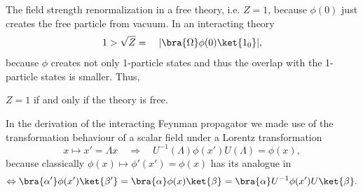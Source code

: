 The field strength renormalization in a free theory, i.e. $Z=1$, because $\phi(0)$ just creates the free particle from vacuum. In an interacting theory
\begin{equation}
	1 > \sqrt{Z} = \quad |\bra{\Omega} \phi(0) \ket{1_0}|,
\end{equation}
because $\phi$ creates not only 1-particle states and thus the overlap with the 1-particle states is smaller. Thus,
\begin{statements}
	$Z=1$ if and only if the theory is free.
\end{statements}
In the derivation of the interacting Feynman propagator we made use of the transformation behaviour of a scalar field under a Lorentz transformation
\begin{equation}
	x \mapsto x'=\Lambda x \quad \Rightarrow \quad U^{-1}(\Lambda)\phi(x') U(\Lambda) = \phi(x),
\end{equation}
because classically $\phi(x) \mapsto \phi'(x')=\phi(x)$ has its analogue in 
\begin{equation}
	\Leftrightarrow \bra{\alpha'} \phi(x') \ket{\beta'} = \bra{\alpha} \phi(x)\ket{\beta}=\bra{\alpha}U^{-1} \phi(x')U\ket{\beta}.
\end{equation}


